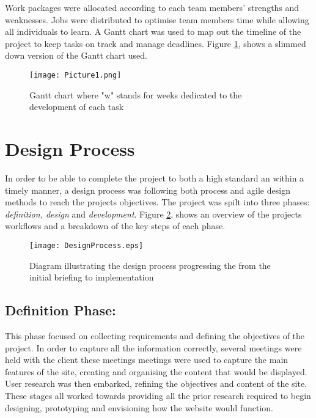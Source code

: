 \documentclass[fontsize=11pt]{extarticle}
\numberwithin{figure}{section} %
\begin{document}
Work packages were allocated according to each team members' strengths
and weaknesses. Jobs were distributed to optimise team members time
while allowing all individuals to learn. A Gantt chart was used to map
out the timeline of the project to keep tasks on track and manage
deadlines. Figure \ref{gantt}, shows a slimmed down version of the Gantt
chart used.

\begin{landscape}
\begin{figure}[H]
      \centering
      \texttt{[image: Picture1.png]}
      \caption{Gantt chart where "w" stands for weeks dedicated to the development of each task}
\label{gantt}
 \end{figure}
 \end{landscape}

\newpage

\hypertarget{design-process}{%
\section{Design Process}\label{design-process}}

In order to be able to complete the project to both a high standard an
within a timely manner, a design process was following both process and
agile design methods to reach the projects objectives. The project was
spilt into three phases: \emph{definition, design} and
\emph{development}. Figure \ref{designprocess}, shows an overview of the
projects workflows and a breakdown of the key steps of each phase.

\begin{figure}[H]
\centering
\texttt{[image: DesignProcess.eps]}
\caption{Diagram illustrating the design process progressing the from the initial briefing to implementation}
\label{designprocess}
\end{figure}

\hypertarget{definition-phase}{%
\subsection{Definition Phase:}\label{definition-phase}}

This phase focused on collecting requirements and defining the
objectives of the project. In order to capture all the information
correctly, several meetings were held with the client these meetings
meetings were used to capture the main features of the site, creating
and organising the content that would be displayed. User research was
then embarked, refining the objectives and content of the site. These
stages all worked towards providing all the prior research required to
begin designing, prototyping and envisioning how the website would
function.
\end{document}
